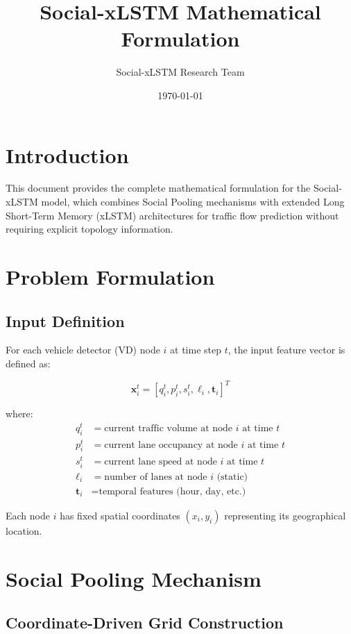 \documentclass[11pt,a4paper]{article}
\title{Social-xLSTM Mathematical Formulation}
\author{Social-xLSTM Research Team}
\date{\today}
\begin{document}
\maketitle

\section{Introduction}

This document provides the complete mathematical formulation for the Social-xLSTM model, which combines Social Pooling mechanisms with extended Long Short-Term Memory (xLSTM) architectures for traffic flow prediction without requiring explicit topology information.

\section{Problem Formulation}

\subsection{Input Definition}

For each vehicle detector (VD) node $i$ at time step $t$, the input feature vector is defined as:

\begin{equation}
\mathbf{x}_i^t = [q_i^t, p_i^t, s_i^t, \ell_i, \mathbf{t}_i]^T
\end{equation}

where:
\begin{align}
q_i^t &= \text{current traffic volume at node } i \text{ at time } t \\
p_i^t &= \text{current lane occupancy at node } i \text{ at time } t \\
s_i^t &= \text{current lane speed at node } i \text{ at time } t \\
\ell_i &= \text{number of lanes at node } i \text{ (static)} \\
\mathbf{t}_i &= \text{temporal features (hour, day, etc.)}
\end{align}

Each node $i$ has fixed spatial coordinates $(x_i, y_i)$ representing its geographical location.

\section{Social Pooling Mechanism}

\subsection{Coordinate-Driven Grid Construction}
\end{document}

